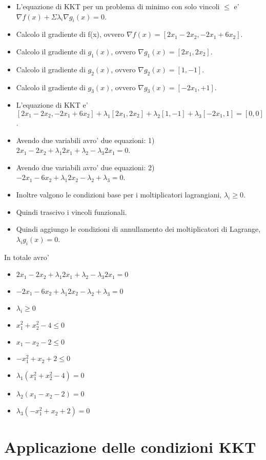 \begin{itemize}
  \item L'equazione di KKT per un problema di minimo con solo vincoli $\leq$ e' $\nabla f(x) + \Sigma \lambda_i \nabla g_i(x) = 0$.
  \item Calcolo il gradiente di f(x), ovvero $\nabla f(x) = [2 x_1 - 2 x_2, -2 x_1 + 6 x_2]$.
  \item Calcolo il gradiente di $g_1(x)$, ovvero $\nabla g_1(x) = [2 x_1, 2 x_2]$.
  \item Calcolo il gradiente di $g_2(x)$, ovvero $\nabla g_2(x) = [1, -1]$.
  \item Calcolo il gradiente di $g_3(x)$, ovvero $\nabla g_3(x) = [-2x_1, +1]$.
  \item L'equazione di KKT e' $[2 x_1 - 2 x_2, -2 x_1 + 6 x_2] + \lambda _1 [2 x_1, 2 x_2] + \lambda _2 [1, -1] + \lambda _3 [-2x_1,1] = [0,0]$.
  \item Avendo due variabili avro' due equazioni: 1) $2x_1 - 2x_2 + \lambda _1 2x_1 + \lambda _2 - \lambda _3 2x_1 = 0$.
  \item Avendo due variabili avro' due equazioni: 2) $-2x_1 - 6x_2 + \lambda _1 2x_2 - \lambda _2 + \lambda _3 = 0$.
  \item Inoltre valgono le condizioni base per i moltiplicatori lagrangiani, $\lambda_i \geq 0$.
  \item Quindi trascivo i vincoli funzionali.
  \item Quindi aggiungo le condizioni di annullamento dei moltiplicatori di Lagrange, $\lambda_i g_i(x) = 0$.
\end{itemize}

In totale avro'

\begin{itemize}
  \item $2x_1 - 2x_2 + \lambda _1 2x_1 + \lambda _2 - \lambda _3 2x_1 = 0$
  \item $-2x_1 - 6x_2 + \lambda _1 2x_2 - \lambda _2 + \lambda _3 = 0$
  \item $\lambda_i \geq 0$
  \item $x_1^2 + x_2^2 - 4 \leq 0$
  \item $x_1 - x_2 - 2 \leq 0$
  \item $- x_1^2 + x_2 + 2 \leq 0$
  \item $\lambda_1 (x_1^2 + x_2^2 - 4) = 0$
  \item $\lambda_2 (x_1 - x_2 - 2) = 0$
  \item $\lambda_3 (- x_1^2 + x_2 + 2) = 0$
\end{itemize}

\section{Applicazione delle condizioni KKT}

